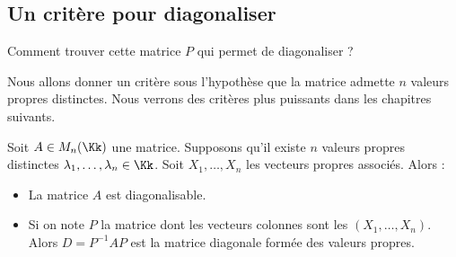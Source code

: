\documentclass[11pt, class=report,crop=false]{standalone}
\begin{document}
\subsection{Un critère pour diagonaliser}

Comment trouver cette matrice $P$ qui permet de diagonaliser ?

Nous allons donner un critère sous l'hypothèse que la matrice admette $n$ valeurs propres distinctes.
Nous verrons des critères plus puissants dans les chapitres suivants.

\begin{proposition}
\label{prop:diagvpdis}
Soit $A \in M_n(\Kk)$ une matrice. Supposons qu'il existe $n$ valeurs propres distinctes $\lambda_1,\ldots,\lambda_n \in \Kk$. Soit $X_1,\ldots,X_n$ les vecteurs propres associés. Alors :
\begin{itemize}
  \item La matrice $A$ est diagonalisable.
  
  \item Si on note $P$ la matrice dont les vecteurs colonnes sont les $(X_1,\ldots,X_n)$.
  Alors $D=P^{-1}AP$ est la matrice diagonale formée des valeurs propres.
\end{itemize}
\end{proposition}
\end{document}

